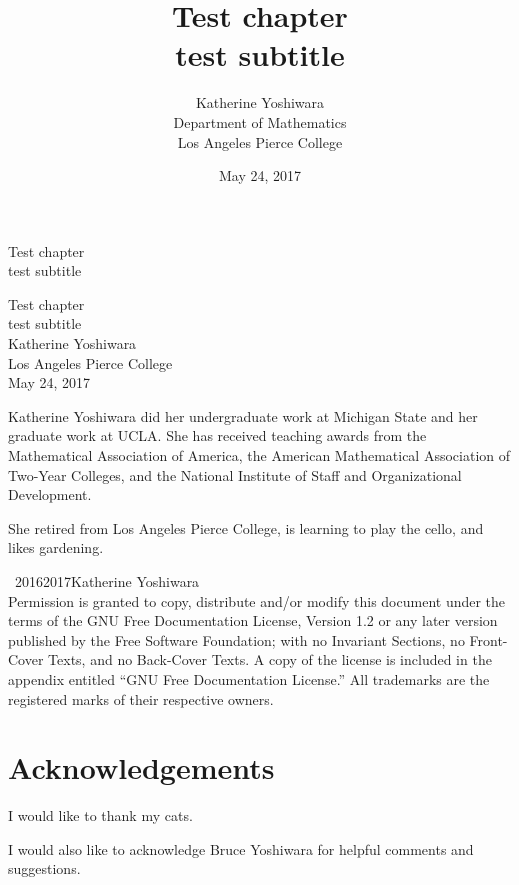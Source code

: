 \documentclass[10pt,]{book}
\title{Test chapter\\
{\large test subtitle}}
\author{Katherine Yoshiwara\\
Department of Mathematics\\
Los Angeles Pierce College
}
\date{May 24, 2017}
\theoremstyle{plain}
\theoremstyle{definition}
\theoremstyle{definition}
\theoremstyle{definition}
\theoremstyle{definition}
\numberwithin{equation}{part}
\begin{document}
\frontmatter
\thispagestyle{empty}
{\centering
\vspace*{0.28\textheight}
{\Huge Test chapter}\\[2\baselineskip]
{\LARGE test subtitle}\\
}
\clearpage
\thispagestyle{empty}
\null%
\clearpage
\thispagestyle{empty}
{\centering
\vspace*{0.14\textheight}
{\Huge Test chapter}\\[\baselineskip]
{\LARGE test subtitle}\\[3\baselineskip]
{\Large Katherine Yoshiwara}\\[0.5\baselineskip]
{\Large Los Angeles Pierce College}\\[3\baselineskip]
{\Large May 24, 2017}\\}
\clearpage
\thispagestyle{empty}
\noindent
Katherine Yoshiwara did her undergraduate work at Michigan State and her graduate work at UCLA. She has received teaching awards from the Mathematical Association of America,  the American Mathematical Association of Two-Year Colleges, and the National Institute of Staff and Organizational Development.%
\par
She retired from Los Angeles Pierce College, is learning to play the cello, and likes gardening.%
\par
{}
\noindent\textcopyright\ 2016\textendash{}2017\quad{}Katherine Yoshiwara\\[0.5\baselineskip]
Permission is granted to copy, distribute and/or modify this document under the terms of the GNU Free Documentation License, Version 1.2 or any later version published by the Free Software Foundation; with no Invariant Sections, no Front-Cover Texts, and no Back-Cover Texts.  A copy of the license is included in the appendix entitled ``GNU Free Documentation License.''  All trademarks\texttrademark{} are the registered\textregistered{} marks of their respective owners.\par\medskip
{}
\null\clearpage
\chapter*{Acknowledgements}\label{acknowledgement-1}
I would like to thank my cats.%
\par
I would also like to acknowledge Bruce Yoshiwara for  helpful comments and suggestions.%
\end{document}
